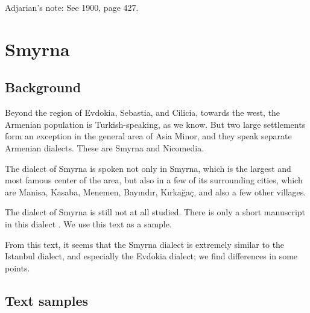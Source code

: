 Adjarian's note: See  1900, page 427. 








\fussy
\chapter{Smyrna} \label{chapter:Smyrna}
\section{Background}

\begin{adjarianpage}\label{page:239}\end{adjarianpage}%

Beyond the region of Evdokia, Sebastia, and Cilicia, towards the west, the Armenian population is Turkish-speaking, as we know. But two large settlements form an exception in the general area of Asia Minor, and they speak separate Armenian dialects. These are Smyrna and Nicomedia. 

The dialect of Smyrna is spoken not only in Smyrna, which is the largest and most famous center of the area, but also in a few of its surrounding cities, which are Manisa, Kasaba, Menemen, Bayındır, Kırkağaç, and also a few other villages. 

The dialect of Smyrna is still not at all studied. There is only a short manuscript in this dialect \citep[300]{Kosian-smyrna}. We use this text as a sample. 

From this text, it seems that the Smyrna dialect is extremely similar to the Istanbul dialect, and especially the Evdokia dialect; we find differences in some points. 


\section{Text samples}

